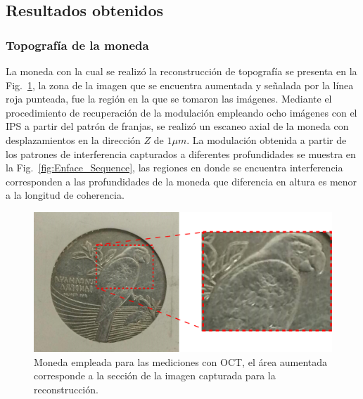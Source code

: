 
\subsection{Resultados obtenidos}
\label{sec:resultados}
\subsubsection{Topografía de la moneda}

La moneda con la cual se realizó la reconstrucción de topografía se presenta en la Fig.~\ref{fig:Moneda_Directa_img}, la zona de la imagen que se encuentra aumentada y señalada por la línea roja punteada, fue la región en la que se tomaron las imágenes. Mediante el procedimiento de recuperación de la modulación empleando ocho imágenes con el IPS a partir del patrón de franjas, se realizó un escaneo axial de la moneda con desplazamientos en la dirección $Z$ de $1\mu m$. La modulación obtenida a partir de los patrones de interferencia capturados a diferentes profundidades se muestra en la Fig.~\ref{fig:Enface_Sequence}, las regiones en donde se encuentra interferencia corresponden a las profundidades de la moneda que diferencia en altura es menor a la longitud de coherencia. 

\begin{figure}[!h]
	\centering
	\includegraphics[width=0.6\linewidth]{img/chap2/Moneda_Directa_img}
	\caption[Moneda empleada en las mediciones.]{Moneda empleada para las mediciones con OCT, el área aumentada corresponde a la sección de la imagen capturada para la reconstrucción.}
	\label{fig:Moneda_Directa_img}
\end{figure}

